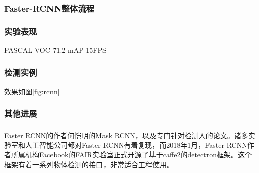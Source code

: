 \documentclass[12pt,a4paper,titlepage]{article}
\newcommand{\upcite}[1]{\textsuperscript{\textsuperscript{\cite{#1}}}}  %
\begin{document}
\subsubsection{Faster-RCNN整体流程}

\subsubsection{实验表现}
PASCAL VOC 71.2 mAP   15FPS
\subsubsection{检测实例}
效果如图\ref{fig:rcnn}
\subsubsection{其他进展}
Faster RCNN的作者何恺明的Mask RCNN，以及专门针对检测人的论文\upcite{gkioxari2017detecting}。诸多实验室和人工智能公司都对Faster-RCNN有着复现，而2018年1月，Faster-RCNN作者所属机构Facebook的FAIR实验室正式开源了基于caffe2的detectron框架。这个框架有着一系列物体检测的接口，非常适合工程使用。
\end{document}
